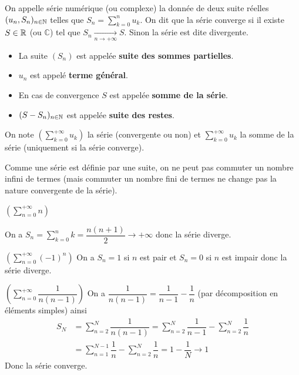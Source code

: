 \documentclass[a4paper, 12pt]{article}
\begin{document}
\begin{definition}
    On appelle série numérique (ou complexe) la donnée de deux suite réelles
    $(u_n, S_n)_{n \in \mathbb{N}}$ telles que $S_n = \sum\limits_{k=0}^{n}u_k$.\n
    On dit que la série converge si il existe $S \in \mathbb{R}$ (ou $\mathbb{C}$) tel que $S_n \underset{n \to +\infty}{\rightarrow} S$.\n
    Sinon la série est dite divergente.

    \begin{itemize}[label=--]
        \item 
        La suite $(S_n)$ est appelée \textbf{suite des sommes partielles}.
        \item
        $u_n$ est appelé \textbf{terme général}.
        \item
        En cas de convergence $S$ est appelée \textbf{somme de la série}.
        \item
        $(S - S_n)_{n \in \mathbb{N}}$ est appelée \textbf{suite des restes}.
    \end{itemize}
\end{definition}

\begin{remarque}
    On note $(\sum\limits_{k=0}^{+\infty} u_k)$ la série (convergente ou non) et $\sum\limits_{k=0}^{+\infty} u_k$ la somme de la série (uniquement si la série converge).
\end{remarque}

\begin{remarque}
    Comme une série est définie par une suite, on ne peut pas commuter un nombre infini de termes
    (mais commuter un nombre fini de termes ne change pas la nature convergente de la série).
\end{remarque}

\begin{exemple}
    $(\sum\limits_{n=0}^{+\infty}n)$

    On a $S_n = \sum\limits_{k=0}^{n} k = \dfrac{n(n+1)}{2} \rightarrow +\infty$ donc la série diverge.
\end{exemple}

\begin{exemple}
    $(\sum\limits_{n=0}^{+\infty}(-1)^n)$\n
    On a $S_n = 1$ si $n$ est pair et $S_n = 0$ si $n$ est impair donc la série diverge.
\end{exemple}

\begin{exemple}
    $(\sum\limits_{n=0}^{+\infty}\dfrac{1}{n(n-1)})$\n
    On a $\dfrac{1}{n(n-1)} = \dfrac{1}{n-1} - \dfrac{1}{n}$ (par décomposition en éléments simples)\n
    ainsi
    \begin{align*}
        S_N &= \sum\limits_{n=2}^{N}\dfrac{1}{n(n-1)} = \sum\limits_{n=2}^{N}\dfrac{1}{n-1} - \sum\limits_{n=2}^{N}\dfrac{1}{n}\\
        &= \sum\limits_{n=1}^{N-1}\dfrac{1}{n} - \sum\limits_{n=2}^{N}\dfrac{1}{n} = 1 - \dfrac{1}{N} \rightarrow 1
    \end{align*}
    Donc la série converge.
\end{exemple}
\end{document}
